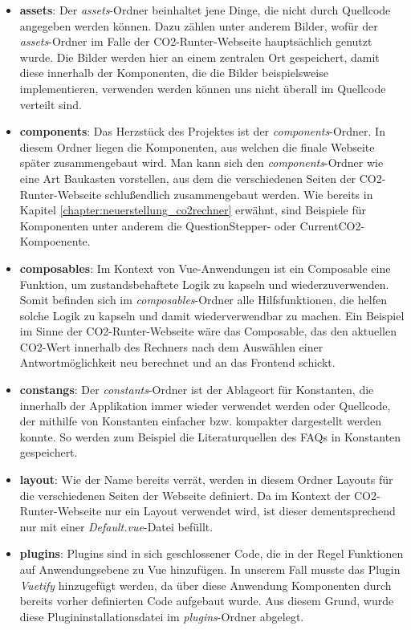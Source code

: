 \begin{itemize}
    \item \textbf{assets}: Der \textit{assets}-Ordner beinhaltet jene Dinge, die nicht durch Quellcode angegeben werden können. Dazu zählen unter anderem Bilder, wofür der \textit{assets}-Ordner im Falle der CO2-Runter-Webseite hauptsächlich genutzt wurde. Die Bilder werden hier an einem zentralen Ort gespeichert, damit diese innerhalb der Komponenten, die die Bilder beispielsweise implementieren, verwenden werden können uns nicht überall im Quellcode verteilt sind.
    \item \textbf{components}: Das Herzstück des Projektes ist der \textit{components}-Ordner. In diesem Ordner liegen die Komponenten, aus welchen die finale Webseite später zusammengebaut wird. Man kann sich den \textit{components}-Ordner wie eine Art Baukasten vorstellen, aus dem die verschiedenen Seiten der CO2-Runter-Webseite schlußendlich zusammengebaut werden. Wie bereits in Kapitel \ref{chapter:neuerstellung_co2rechner} erwähnt, sind Beispiele für Komponenten unter anderem die QuestionStepper- oder CurrentCO2-Kompoenente.
    \item \textbf{composables}: Im Kontext von Vue-Anwendungen ist ein Composable eine Funktion, um zustandsbehaftete Logik zu kapseln und wiederzuverwenden. Somit befinden sich im \textit{composables}-Ordner alle Hilfsfunktionen, die helfen solche Logik zu kapseln und damit wiederverwendbar zu machen. Ein Beispiel im Sinne der CO2-Runter-Webseite wäre das Composable, das den aktuellen CO2-Wert innerhalb des Rechners nach dem Auswählen einer Antwortmöglichkeit neu berechnet und an das Frontend schickt.
    \item \textbf{constangs}: Der \textit{constants}-Ordner ist der Ablageort für Konstanten, die innerhalb der Applikation immer wieder verwendet werden oder Quellcode, der mithilfe von Konstanten einfacher bzw. kompakter dargestellt werden konnte. So werden zum Beispiel die Literaturquellen des FAQs in Konstanten gespeichert.
    \item \textbf{layout}: Wie der Name bereits verrät, werden in diesem Ordner Layouts für die verschiedenen Seiten der Webseite definiert. Da im Kontext der CO2-Runter-Webseite nur ein Layout verwendet wird, ist dieser dementsprechend nur mit einer \textit{Default.vue}-Datei befüllt.
    \item \textbf{plugins}: Plugins sind in sich geschlossener Code, die in der Regel Funktionen auf Anwendungsebene zu Vue hinzufügen. In unserem Fall musste das Plugin \textit{Vuetify} hinzugefügt werden, da über diese Anwendung Komponenten durch bereits vorher definierten Code aufgebaut wurde. Aus diesem Grund, wurde diese Plugininstallationsdatei im \textit{plugins}-Ordner abgelegt.

\end{itemize}
